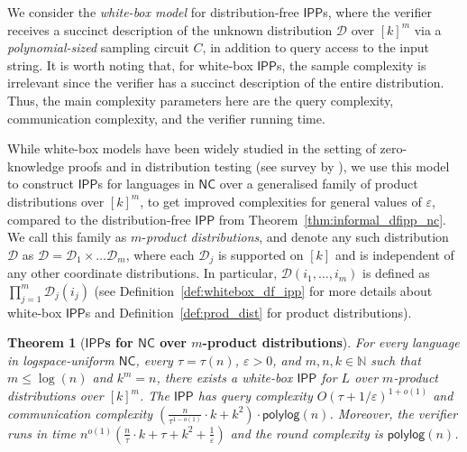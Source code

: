 \documentclass[10pt,a4paper]{article}
\newtheorem{theorem}{Theorem}[section]
\newcommand{\polylog}{\mathsf{polylog}}
\newcommand{\NC}{\mathsf{NC}}
\newcommand{\IPP}{\mathsf{IPP}}
\newcommand{\N}{\mathbb{N}}
\newcommand{\sD}{\mathcal{D}}
\newcommand{\eps}{\varepsilon}
\begin{document}
We consider the \textit{white-box model} for distribution-free $\IPP$s, where the verifier receives a succinct description of the unknown distribution $\sD$ over $[k]^m$ via a \textit{polynomial-sized} sampling circuit $C$, in addition to query access to the input string. It is worth noting that, for white-box $\IPP$s, the sample complexity is irrelevant since the verifier has a succinct description of the entire distribution. Thus, the main complexity parameters here are the query complexity, communication complexity, and the verifier running time. 

While white-box models have been widely studied in the setting of zero-knowledge proofs \cite{SV97,vadhan_thesis,vadhan06_czk} and in distribution testing (see survey by \cite{GV11_survey}), we use this model to construct $\IPP$s for languages in $\NC$ over a generalised family of product distributions over $[k]^m$, to get improved complexities for general values of $\eps$, compared to the distribution-free $\IPP$ from Theorem~\ref{thm:informal_dfipp_nc}. We call this family as $m$-\textit{product distributions}, and denote any such distribution $\sD$ as $\sD = \sD_1 \times \dots \sD_m$, where each $\sD_j$ is supported on $[k]$ and is independent of any other coordinate distributions. In particular, $\sD(i_1, \dots, i_m)$ is defined as $\prod_{j=1}^m \sD_j(i_j)$ (see Definition~\ref{def:whitebox_df_ipp} for more details about white-box $\IPP$s  and Definition~\ref{def:prod_dist} for product distributions).

\begin{theorem}[\textbf{$\IPP$s for $\NC$ over $m$-product distributions}]
    \label{thm:informal_product_dfipp}
    For every language in logspace-uniform $\NC$, every $\tau=\tau(n)$, $\eps >0$, and $m,n,k \in \N$ such that $m \leq \log(n)$ and $k^m = n$, there exists a white-box $\IPP$ for $L$ over $m$-product distributions over $[k]^m$. The $\IPP$ has query complexity $O(\tau+ 1/\eps)^{1+o(1)}$ and communication complexity $\left(\frac{n}{\tau^{1-o(1)}} \cdot k+k^{2}\right) \cdot \polylog(n)$. Moreover, the verifier runs in time $n^{o(1)}\left(\frac{n}{\tau}\cdot k + \tau + k^2 + \frac{1}{\eps}\right)$ and the round complexity is $\polylog(n)$. 
\end{theorem}
\end{document}
